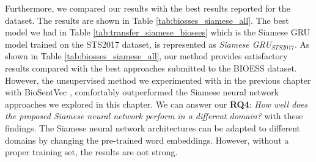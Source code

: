 \begin{table}[htb]
	\centering
	\caption[Results comparison for BIOSSES with top results]{Results for BIOSSES dataset with different variants of Siamese Neural Network compared with top results reported for BIOSSES. For each variant, Pearson Correlation ($\bm{\rho}$) is reported between the predicted values and the gold labels of the test set. }  
	\label{tab:biosses_siamese_all}
\end{table}


Furthermore, we compared our results with the best results reported for the dataset. The results are shown in Table \ref{tab:biosses_siamese_all}. The best model we had in Table \ref{tab:transfer_siamese_biosses} which is the Siamese GRU model trained on the STS2017 dataset, is represented as \textit{Siamese GRU$_{STS2017}$}. As shown in Table \ref{tab:biosses_siamese_all}, our method provides satisfactory results compared with the best approaches submitted to the BIOESS dataset. However, the unsupervised method we experimented with in the previous chapter with BioSentVec \autocite{8904728}, comfortably outperformed the Siamese neural network approaches we explored in this chapter. We can answer our \textbf{RQ4}: \textit{How well does the proposed Siamese neural network perform in a different domain?} with these findings. The Siamese neural network architectures can be adapted to different domains by changing the pre-trained word embeddings. However, without a proper training set, the results are not strong. 

